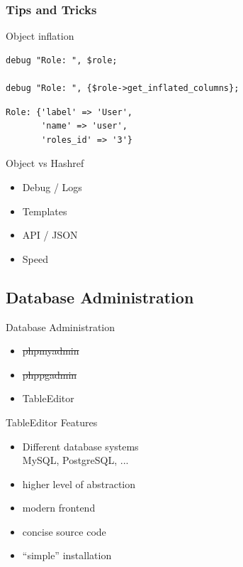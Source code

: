 \subsubsection{Tips and Tricks}

\begin{frame}[fragile]{Object inflation}
\begin{lstlisting}
debug "Role: ", $role;

debug "Role: ", {$role->get_inflated_columns};
\end{lstlisting}
\begin{lstlisting}
Role: {'label' => 'User',
       'name' => 'user',
       'roles_id' => '3'} 
\end{lstlisting}
\end{frame}

\begin{frame}{Object vs Hashref}
\begin{itemize}
\item Debug / Logs
\item Templates
\item API / JSON
\item Speed
\end{itemize}
\end{frame}


\subsection{Database Administration}
\begin{frame}{Database Administration}
\begin{itemize}
\item \sout{phpmyadmin}
\item \sout{phppgadmin}
\item TableEditor
\end{itemize}
\end{frame}

\begin{frame}{TableEditor Features}
\begin{itemize}
\item Different database systems \\
      MySQL, PostgreSQL, ...
\item higher level of abstraction
\item modern frontend
\item concise source code
\item ``simple'' installation
\end{itemize}
\end{frame}

